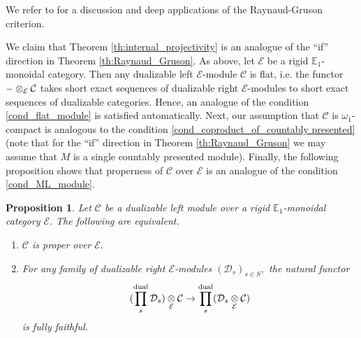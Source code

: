 \documentclass[11pt,leqno]{amsart}
\newtheorem{prop}[theo]{Proposition}
\numberwithin{equation}{section}
\newcommand{\tens}[1]{%
  \mathbin{\mathop{\otimes}\displaylimits_{#1}}%
}
\newcommand{\prodd}[1][]{\mathop{\prod}\limits_{#1}}
\newcommand{\dual}{\operatorname{dual}}
\newcommand{\bE}{{\mathbb E}}
\newcommand{\cD}{{\mathcal D}}
\newcommand{\cC}{{\mathcal C}}
\newcommand{\cE}{{\mathcal E}}
\begin{document}
We refer to \cite{Dri06} for a discussion and deep applications of the Raynaud-Gruson criterion. 

We claim that Theorem \ref{th:internal_projectivity} is an analogue of the ``if'' direction in Theorem \ref{th:Raynaud_Gruson}. As above, let $\cE$ be a rigid $\bE_1$-monoidal category. Then any dualizable left $\cE$-module $\cC$ is flat, i.e. the functor $-\tens{\cE}\cC$ takes short exact sequences of dualizable right $\cE$-modules to short exact sequences of dualizable categories. Hence, an analogue of the condition \ref{cond_flat_module} is satisfied automatically. Next, our assumption that $\cC$ is $\omega_1$-compact is analogous to the condition \ref{cond_coproduct_of_countably presented} (note that for the ``if'' direction in Theorem \ref{th:Raynaud_Gruson} we may assume that $M$ is a single countably presented module). Finally, the following proposition shows that properness of $\cC$ over $\cE$ is an analogue of the condition \ref{cond_ML_module}.

\begin{prop}\label{prop:proper_same_as_Mittag_Leffler}
	Let $\cC$ be a dualizable left module over a rigid $\bE_1$-monoidal category $\cE.$ The following are equivalent.
	\begin{enumerate}[label=(\roman*),ref=(\roman*)]
		\item $\cC$ is proper over $\cE.$ \label{cond_properness}
		\item For any family of dualizable right $\cE$-modules $(\cD_s)_{s\in S},$ the natural functor
		\begin{equation*}
			(\prodd[s]^{\dual}\cD_s)\tens{\cE}\cC\to\prodd[s]^{\dual}(\cD_s\tens{\cE}\cC)	
		\end{equation*}
		is fully faithful. \label{cond_via_tensoring_with_products}
	\end{enumerate}
\end{prop}
\end{document}
